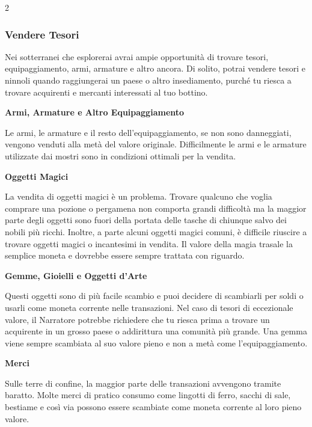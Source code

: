 \begin{multicols}{2}

\subsubsection{Vendere Tesori}

Nei sotterranei che esplorerai avrai ampie opportunità di trovare tesori, equipaggiamento, armi, armature e altro ancora. Di solito, potrai vendere tesori e ninnoli quando raggiungerai un paese o altro insediamento, purché tu riesca a trovare acquirenti e mercanti interessati al tuo bottino.

\medskip

\textbf{Armi, Armature e Altro Equipaggiamento }

Le armi, le armature e il resto dell'equipaggiamento, se non sono danneggiati, vengono venduti alla metà del valore originale. Difficilmente le armi e le armature utilizzate dai mostri sono in condizioni ottimali per la vendita.

\medskip

\textbf{Oggetti Magici}

La vendita di oggetti magici è un problema. Trovare qualcuno che voglia comprare una pozione o pergamena non comporta grandi difficoltà ma la maggior parte degli oggetti sono fuori della portata delle tasche di chiunque salvo dei nobili più ricchi. Inoltre, a parte alcuni oggetti magici comuni, è difficile riuscire a trovare oggetti magici o incantesimi in vendita. Il valore della magia trasale la semplice moneta e dovrebbe essere sempre trattata con riguardo.

\medskip

\textbf{Gemme, Gioielli e Oggetti d'Arte}

Questi oggetti sono di più facile scambio e puoi decidere di scambiarli per soldi o usarli come moneta corrente nelle transazioni. Nel caso di tesori di eccezionale valore, il Narratore potrebbe richiedere che tu riesca prima a trovare un acquirente in un grosso paese o addirittura una comunità più grande. Una gemma viene sempre scambiata al suo valore pieno e non a metà come l'equipaggiamento.

\medskip

\textbf{Merci}

Sulle terre di confine, la maggior parte delle transazioni avvengono tramite baratto. Molte merci di pratico consumo come lingotti di ferro, sacchi di sale, bestiame e così via possono essere scambiate come moneta corrente al loro pieno valore.


\end{multicols}
